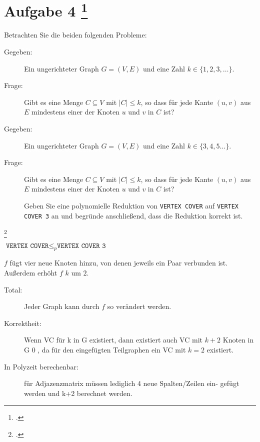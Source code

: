 \documentclass{lehramt-informatik-aufgabe}
\begin{document}
\section{Aufgabe 4
\footcite{46115:2016:09}}

Betrachten Sie die beiden folgenden Probleme:


\begin{description}
\item[Gegeben:]

Ein ungerichteter Graph $G = (V, E)$ und eine Zahl $k \in \{ 1, 2, 3,
\dots \}$.

\item[Frage:]

Gibt es eine Menge $C \subseteq V$ mit $|C| \leq k$, so dass für jede
Kante $(u, v)$ aus $E$ mindestens einer der Knoten $u$ und $v$ in $C$
ist?
\end{description}


\begin{description}
\item[Gegeben:]

Ein ungerichteter Graph $G = (V, E)$ und eine Zahl $k \in \{ 3, 4, 5
\dots \}$.

\item[Frage:]

Gibt es eine Menge $C \subseteq V$ mit $|C| \leq k$, so dass für jede
Kante $(u, v)$ aus $E$ mindestens einer der Knoten $u$ und $v$ in $C$
ist?

Geben Sie eine polynomielle Reduktion von \texttt{VERTEX COVER} auf
\texttt{VERTEX COVER 3} an und begründe anschließend, dass die
Reduktion korrekt ist.
\end{description}
\footcite[Seite 12, Aufgabe 13]{theo:ab:4}

\begin{liAntwort}

$\texttt{VERTEX COVER} \leq_p \texttt{VERTEX COVER 3}$

$f$ fügt vier neue Knoten hinzu, von denen jeweils ein Paar verbunden
ist. Außerdem erhöht $f$ $k$ um $2$.

\begin{description}
\item[Total:]

Jeder Graph kann durch $f$ so verändert werden.

\item[Korrektheit:]

Wenn VC für k in G existiert, dann existiert auch VC mit $k + 2$ Knoten
in G 0 , da für den eingefügten Teilgraphen ein VC mit $k = 2$
existiert.

\item[In Polyzeit berechenbar:]

für Adjazenzmatrix müssen lediglich 4 neue Spalten/Zeilen ein-
gefügt werden und k+2 berechnet werden.
\end{description}

\end{liAntwort}
\end{document}
